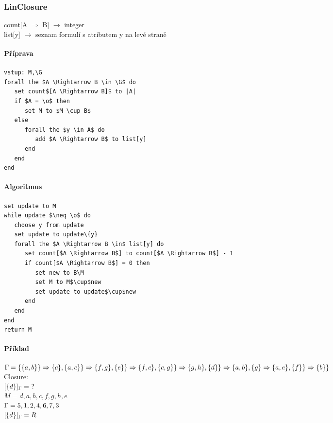 \documentclass[10pt,a4paper]{article}
\begin{document}
\subsubsection{LinClosure}
count[A $\Rightarrow$ B] $\rightarrow$ integer\\
list[y] $\rightarrow$ seznam formulí s atributem y na levé straně
\paragraph{Příprava}
\paragraph{}

\begin{lstlisting}
vstup: M,\G
forall the $A \Rightarrow B \in \G$ do
   set count$[A \Rightarrow B]$ to |A|
   if $A = \o$ then
      set M to $M \cup B$
   else
      forall the $y \in A$ do
         add $A \Rightarrow B$ to list[y]
      end
   end
end
\end{lstlisting}

\paragraph{Algoritmus}
\paragraph{}

\begin{lstlisting}
set update to M
while update $\neq \o$ do
   choose y from update
   set update to update\{y}
   forall the $A \Rightarrow B \in$ list[y] do
      set count[$A \Rightarrow B$] to count[$A \Rightarrow B$] - 1
      if count[$A \Rightarrow B$] = 0 then
         set new to B\M
         set M to M$\cup$new
         set update to update$\cup$new
      end
   end
end
return M
\end{lstlisting}

\paragraph{Příklad}
$\\\Gamma = \{\{a,b\}\} \Rightarrow \{c\},\\ \{a,c\}\} \Rightarrow \{f,g\},\\ \{e\}\} \Rightarrow \{f,c\},\\ \{c,g\}\} \Rightarrow \{g,h\},\\ \{d\}\} \Rightarrow \{a,b\},\\ \{g\} \Rightarrow \{a,e\},\\ \{f\}\} \Rightarrow \{b\}\}$\\[2ex]
Closure:\\
$[\{d\}]_\Gamma =~?$\\
$M = d, a, b, c, f, g, h, e$\\
$\Gamma = 5, 1, 2, 4, 6, 7, 3$\\
$[\{d\}]_\Gamma = R$\\[2ex]
\end{document}
